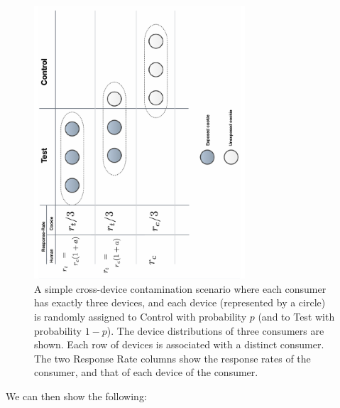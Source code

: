 \documentclass[11pt,a4paper]{article}
\theoremstyle{definition}
\theoremstyle{remark}
\theoremstyle{definition}
\theoremstyle{definition}
\theoremstyle{definition}
\theoremstyle{definition}
\theoremstyle{definition}
\theoremstyle{definition}
\begin{document}
\begin{figure}\centering
\includegraphics[width=0.7\textwidth,angle=270]{contam-dilution.pdf}
\caption{\small A simple cross-device contamination scenario where each consumer has exactly three devices, and each device (represented by a circle) is randomly assigned to Control with probability $p$ (and to Test with probability $1-p$). The device distributions of three consumers are shown. Each row of devices is associated with a distinct consumer. The two Response Rate columns show the response rates of the consumer, and that of each device of the consumer.}
\label{fig-contam-dilution}
\end{figure}



We can then show the following:
\end{document}
